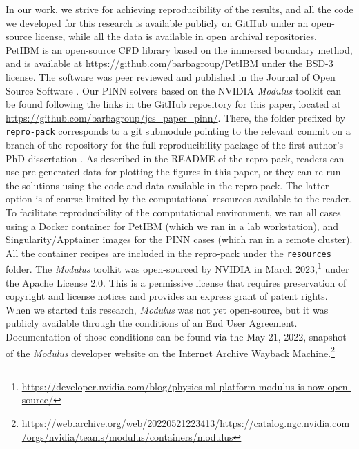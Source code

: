 
In our work, we strive for achieving reproducibility of the results, and all the code we developed for this research is available publicly on GitHub under an open-source license, while all the data is available in open archival repositories.
PetIBM is an open-source CFD library based on the immersed boundary method, and is available at \url{https://github.com/barbagroup/PetIBM} under the BSD-3 license. 
The software was peer reviewed and published in the Journal of Open Source Software \cite{chuang_petibm_2018}. 
Our PINN solvers based on the NVIDIA \emph{Modulus} toolkit can be found following the links in the GitHub repository for this paper, located at \url{https://github.com/barbagroup/jcs_paper_pinn/}. 
There, the folder prefixed by \texttt{repro-pack} corresponds to a git submodule pointing to the relevant commit on a branch of the repository for the full reproducibility package of the first author's PhD dissertation \cite{chuang_thesis_2023}.
As described in the README of the repro-pack, readers can use pre-generated data for plotting the figures in this paper, or they can re-run the solutions using the code and data available in the repro-pack.
The latter option is of course limited by the computational resources available to the reader.
To facilitate reproducibility of the computational environment, we ran all cases using a Docker container for PetIBM (which we ran in a lab workstation), and Singularity/Apptainer images for the PINN cases (which ran in a remote cluster). 
All the container recipes are included in the repro-pack under the \texttt{resources} folder. 
The \emph{Modulus} toolkit was open-sourced by NVIDIA in March 2023,\footnote{\url{https://developer.nvidia.com/blog/physics-ml-platform-modulus-is-now-open-source/}} under the Apache License 2.0.
This is a permissive license that requires preservation of copyright and license notices and provides an express grant of patent rights. 
When we started this research, \emph{Modulus} was not yet open-source, but it was publicly available through the conditions of an End User Agreement. 
Documentation of those conditions can be found via the May 21, 2022, snapshot of the \emph{Modulus} developer website on the Internet Archive Wayback Machine.\footnote{\url{https://web.archive.org/web/20220521223413/https://catalog.ngc.nvidia.com/orgs/nvidia/teams/modulus/containers/modulus}}